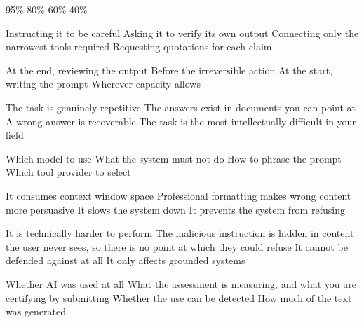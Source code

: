 \documentclass[11pt,a4paper]{article}
\begin{document}
\begin{questions}
  {95\%}
  {80\%}
  {60\%}
  {40\%}

  {Instructing it to be careful}
  {Asking it to verify its own output}
  {Connecting only the narrowest tools required}
  {Requesting quotations for each claim}

  {At the end, reviewing the output}
  {Before the irreversible action}
  {At the start, writing the prompt}
  {Wherever capacity allows}

  {The task is genuinely repetitive}
  {The answers exist in documents you can point at}
  {A wrong answer is recoverable}
  {The task is the most intellectually difficult in your field}

  {Which model to use}
  {What the system must not do}
  {How to phrase the prompt}
  {Which tool provider to select}

  {It consumes context window space}
  {Professional formatting makes wrong content more persuasive}
  {It slows the system down}
  {It prevents the system from refusing}

  {It is technically harder to perform}
  {The malicious instruction is hidden in content the user never sees, so there is no point at which they could refuse}
  {It cannot be defended against at all}
  {It only affects grounded systems}

  {Whether AI was used at all}
  {What the assessment is measuring, and what you are certifying by submitting}
  {Whether the use can be detected}
  {How much of the text was generated}

\end{questions}
\end{document}
